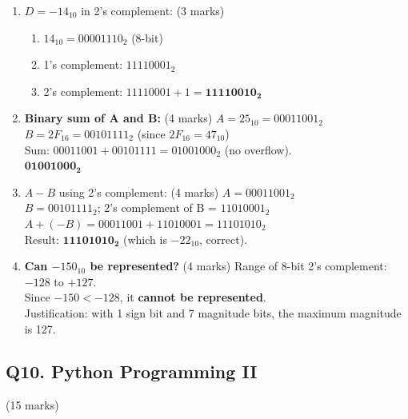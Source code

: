 \documentclass[12pt]{article}
\begin{document}
\begin{enumerate}[label=(\alph*)]
    \item $D = -14_{10}$ in 2's complement: \hfill (3 marks)
    \begin{enumerate}
        \item $14_{10} = 00001110_2$ (8-bit)
        \item 1's complement: $11110001_2$
        \item 2's complement: $11110001 + 1 = \mathbf{11110010_2}$
    \end{enumerate}

    \item \textbf{Binary sum of A and B:} \hfill (4 marks)
    $A = 25_{10} = 00011001_2$ \\
    $B = 2F_{16} = 00101111_2$ (since $2F_{16} = 47_{10}$) \\
    Sum: $00011001 + 00101111 = 01001000_2$ (no overflow). \\
    $\mathbf{01001000_2}$

    \item $A - B$ using 2's complement: \hfill (4 marks)
    $A = 00011001_2$ \\
    $B = 00101111_2$; 2's complement of B = $11010001_2$ \\
    $A + (-B) = 00011001 + 11010001 = 11101010_2$ \\
    Result: $\mathbf{11101010_2}$ (which is $-22_{10}$, correct).

    \item \textbf{Can $-150_{10}$ be represented?} \hfill (4 marks)
    Range of 8-bit 2's complement: $-128$ to $+127$. \\
    Since $-150 < -128$, it \textbf{cannot be represented}. \\
    Justification: with 1 sign bit and 7 magnitude bits, the maximum magnitude is 127.
\end{enumerate}

\bigskip

\subsection*{Q10. Python Programming II} \hfill (15 marks)
\end{document}
